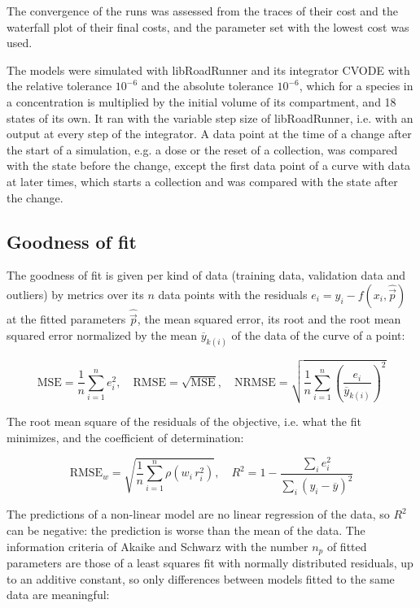 \documentclass{article}
\begin{document}
The convergence of the runs was assessed from the traces of their cost and the waterfall plot of their final costs, and the parameter set with the lowest cost was used.

The models were simulated with libRoadRunner \cite{Welsh2023} and its integrator CVODE \cite{Hindmarsh2005} with the relative tolerance $10^{-6}$ and the absolute tolerance $10^{-6}$, which for a species in a concentration is multiplied by the initial volume of its compartment, and 18 states of its own. It ran with the variable step size of libRoadRunner, i.e. with an output at every step of the integrator. A data point at the time of a change after the start of a simulation, e.g. a dose or the reset of a collection, was compared with the state before the change, except the first data point of a curve with data at later times, which starts a collection and was compared with the state after the change.

\subsection{Goodness of fit}

The goodness of fit is given per kind of data (training data, validation data and outliers) by metrics over its $n$ data points with the residuals $e_i = y_i - f(x_i, \hat{\vec{p}})$ at the fitted parameters $\hat{\vec{p}}$, the mean squared error, its root and the root mean squared error normalized by the mean $\overline{y}_{k(i)}$ of the data of the curve of a point:

\begin{equation}
\mathrm{MSE} = \frac{1}{n} \sum_{i=1}^{n} e_i^2, \quad \mathrm{RMSE} = \sqrt{\mathrm{MSE}}, \quad \mathrm{NRMSE} = \sqrt{\frac{1}{n} \sum_{i=1}^{n} \left(\frac{e_i}{\overline{y}_{k(i)}}\right)^2}
\end{equation}

The root mean square of the residuals of the objective, i.e. what the fit minimizes, and the coefficient of determination:

\begin{equation}
\mathrm{RMSE}_w = \sqrt{\frac{1}{n} \sum_{i=1}^{n} \rho\left(w_i\, r_i^2\right)}, \quad R^2 = 1 - \frac{\sum_{i} e_i^2}{\sum_{i} \left(y_i - \overline{y}\right)^2}
\end{equation}

The predictions of a non-linear model are no linear regression of the data, so $R^2$ can be negative: the prediction is worse than the mean of the data. The information criteria of Akaike \cite{Akaike1974} and Schwarz \cite{Schwarz1978} with the number $n_p$ of fitted parameters are those of a least squares fit with normally distributed residuals, up to an additive constant, so only differences between models fitted to the same data are meaningful:
\end{document}
